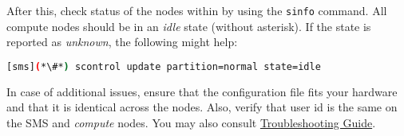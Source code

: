 

After this, check status of the nodes within \SLURM{} by using the
\texttt{sinfo} command. All compute nodes should be in an {\em idle} state
(without asterisk). If the state is reported as {\em unknown}, the following
might help:

\begin{lstlisting}[language=bash]
[sms](*\#*) scontrol update partition=normal state=idle
\end{lstlisting}

In case of additional \SLURM{} issues, ensure that the configuration file fits
your hardware and that it is identical across the nodes. Also, verify
that \SLURM{} user id is the same on the SMS and {\em compute} nodes. You may
also consult
\href{https://slurm.schedmd.com/troubleshoot.html}{\color{blue}\SLURM{}
Troubleshooting Guide}.
